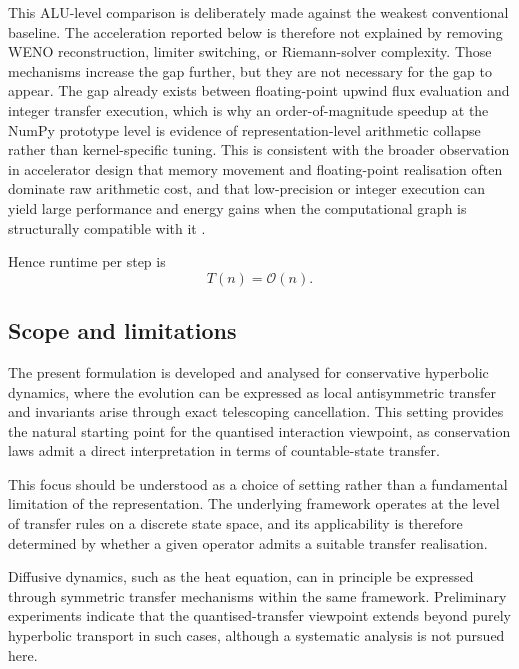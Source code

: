 \documentclass[sn-basic]{sn-jnl}
\theoremstyle{plain}
\theoremstyle{remark}
\begin{document}
This ALU-level comparison is deliberately made against the weakest conventional baseline. The acceleration reported below is therefore not explained by removing WENO reconstruction, limiter switching, or Riemann-solver complexity. Those mechanisms increase the gap further, but they are not necessary for the gap to appear. The gap already exists between floating-point upwind flux evaluation and integer transfer execution, which is why an order-of-magnitude speedup at the NumPy prototype level is evidence of representation-level arithmetic collapse rather than kernel-specific tuning. This is consistent with the broader observation in accelerator design that memory movement and floating-point realisation often dominate raw arithmetic cost, and that low-precision or integer execution can yield large performance and energy gains when the computational graph is structurally compatible with it \cite{hanEIEEfficientInference2016,buiRealtimeHamiltonjacobiReachability2021,ebrahimiEvaluationFPGAHardware2017}.

Hence runtime per step is
\begin{equation}
T(n) = \mathcal{O}(n).
\label{eq:complexity}
\end{equation}

\subsection{Scope and limitations}
\label{subsec:scope_limitations}

The present formulation is developed and analysed for conservative hyperbolic dynamics, where the evolution can be expressed as local antisymmetric transfer and invariants arise through exact telescoping cancellation. This setting provides the natural starting point for the quantised interaction viewpoint, as conservation laws admit a direct interpretation in terms of countable-state transfer.

This focus should be understood as a choice of setting rather than a fundamental limitation of the representation. The underlying framework operates at the level of transfer rules on a discrete state space, and its applicability is therefore determined by whether a given operator admits a suitable transfer realisation.

Diffusive dynamics, such as the heat equation, can in principle be expressed through symmetric transfer mechanisms within the same framework. Preliminary experiments indicate that the quantised-transfer viewpoint extends beyond purely hyperbolic transport in such cases, although a systematic analysis is not pursued here.
\end{document}
